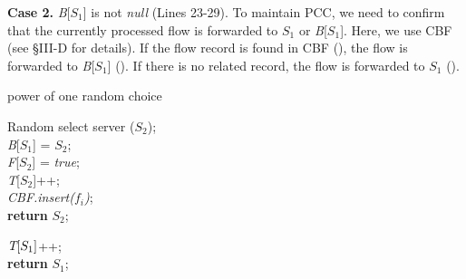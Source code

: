 {\textbf{Case 2.} \emph{B}[\emph{$S_1$}] is not \emph{null} (Lines 23-29). To maintain PCC, we need to confirm that the currently processed flow is forwarded to \emph{$S_1$} or \emph{B}[\emph{$S_1$}]. Here, we use CBF (see \S III-D for details). If the flow record is found in CBF (), the flow is forwarded to \emph{B}[\emph{$S_1$}] (). If there is no related record, the flow is forwarded to \emph{$S_1$} ().

\begin{algorithm}[t]
	\caption{power of one random choice}
	\label{alg:example}
	
	
	 {
		Random select server (\emph{$S_2$}); \\
		 {
			\emph{B}[\emph{$S_1$}] = \emph{$S_2$}; \\
			\emph{F}[\emph{$S_2$}] = \emph{true};  \\ \emph{T}[\emph{$S_2$}]++; \\
			\emph{CBF.insert($f_i$)}; \\
			\textbf{return} \emph{$S_2$};
		} 
	} 
	
	 {
		\emph{$\emph{T}[\emph{$S_1$}]$}++; \\
		\textbf{return} \emph{$S_1$};
	} 
\end{algorithm}

}

